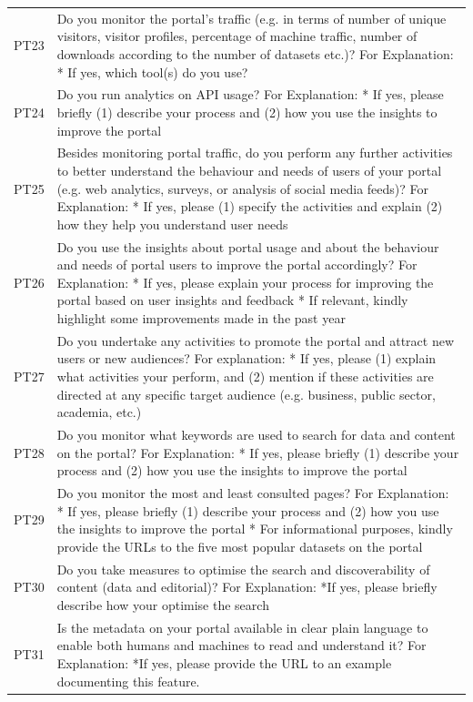 {\begin{longtable}[]{@{}
  L{0.1386}
  L{0.8614}@{}}
PT23 & Do you monitor the portal's traffic (e.g. in terms of number of unique visitors, visitor profiles, percentage of machine traffic, number of downloads according to the number of datasets etc.)? For Explanation: * If yes, which tool(s) do you use? \\
PT24 & Do you run analytics on API usage? For Explanation: * If yes, please briefly (1) describe your process and (2) how you use the insights to improve the portal \\
PT25 & Besides monitoring portal traffic, do you perform any further activities to better understand the behaviour and needs of users of your portal (e.g. web analytics, surveys, or analysis of social media feeds)? For Explanation: * If yes, please (1) specify the activities and explain (2) how they help you understand user needs \\
PT26 & Do you use the insights about portal usage and about the behaviour and needs of portal users to improve the portal accordingly? For Explanation: * If yes, please explain your process for improving the portal based on user insights and feedback * If relevant, kindly highlight some improvements made in the past year \\
PT27 & Do you undertake any activities to promote the portal and attract new users or new audiences? For explanation: * If yes, please (1) explain what activities your perform, and (2) mention if these activities are directed at any specific target audience (e.g. business, public sector, academia, etc.) \\
PT28 & Do you monitor what keywords are used to search for data and content on the portal? For Explanation: * If yes, please briefly (1) describe your process and (2) how you use the insights to improve the portal \\
PT29 & Do you monitor the most and least consulted pages? For Explanation: * If yes, please briefly (1) describe your process and (2) how you use the insights to improve the portal * For informational purposes, kindly provide the URLs to the five most popular datasets on the portal \\
PT30 & Do you take measures to optimise the search and discoverability of content (data and editorial)? For Explanation: *If yes, please briefly describe how your optimise the search \\
PT31 & Is the metadata on your portal available in clear plain language to enable both humans and machines to read and understand it? For Explanation: *If yes, please provide the URL to an example documenting this feature. \\

\end{longtable}}
